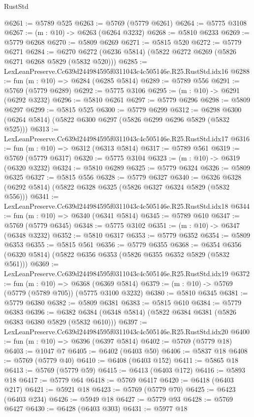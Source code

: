 \begin{lexlean}{RustStd}
\begin{coremodule}
@6261 := @5789 @525
@6263 := @5769 (@5779 @6261)
@6264 := @5775 @3108
@6267 := (m : @10) -> @6263 (@6264 @3232)
@6268 := @5810 @6233
@6269 := @5779 @6268
@6270 := @5809 @6269
@6271 := @5815 @520
@6272 := @5779 @6271
@6284 := @6270 @6272 (@6236 @5814) (@5822 @6272 @6269 (@5826 @6271 @6268 @5829 (@5832 @520)))
@6285 := LexLeanPreserve.Cc639d244984595f0311043c4c505146e.R25.RustStd.idx16
@6288 := fun (m : @10) => @6284 (@6285 @5814)
@6289 := @5789 @556
@6291 := @5769 (@5779 @6289)
@6292 := @5775 @3106
@6295 := (m : @10) -> @6291 (@6292 @3232)
@6296 := @5810 @6261
@6297 := @5779 @6296
@6298 := @5809 @6297
@6299 := @5815 @525
@6300 := @5779 @6299
@6312 := @6298 @6300 (@6264 @5814) (@5822 @6300 @6297 (@5826 @6299 @6296 @5829 (@5832 @525)))
@6313 := LexLeanPreserve.Cc639d244984595f0311043c4c505146e.R25.RustStd.idx17
@6316 := fun (m : @10) => @6312 (@6313 @5814)
@6317 := @5789 @561
@6319 := @5769 (@5779 @6317)
@6320 := @5775 @3104
@6323 := (m : @10) -> @6319 (@6320 @3232)
@6324 := @5810 @6289
@6325 := @5779 @6324
@6326 := @5809 @6325
@6327 := @5815 @556
@6328 := @5779 @6327
@6340 := @6326 @6328 (@6292 @5814) (@5822 @6328 @6325 (@5826 @6327 @6324 @5829 (@5832 @556)))
@6341 := LexLeanPreserve.Cc639d244984595f0311043c4c505146e.R25.RustStd.idx18
@6344 := fun (m : @10) => @6340 (@6341 @5814)
@6345 := @5789 @610
@6347 := @5769 (@5779 @6345)
@6348 := @5775 @3102
@6351 := (m : @10) -> @6347 (@6348 @3232)
@6352 := @5810 @6317
@6353 := @5779 @6352
@6354 := @5809 @6353
@6355 := @5815 @561
@6356 := @5779 @6355
@6368 := @6354 @6356 (@6320 @5814) (@5822 @6356 @6353 (@5826 @6355 @6352 @5829 (@5832 @561)))
@6369 := LexLeanPreserve.Cc639d244984595f0311043c4c505146e.R25.RustStd.idx19
@6372 := fun (m : @10) => @6368 (@6369 @5814)
@6379 := (m : @10) -> @5769 (@5779 (@5789 @705)) (@5775 @3100 @3232)
@6380 := @5810 @6345
@6381 := @5779 @6380
@6382 := @5809 @6381
@6383 := @5815 @610
@6384 := @5779 @6383
@6396 := @6382 @6384 (@6348 @5814) (@5822 @6384 @6381 (@5826 @6383 @6380 @5829 (@5832 @610)))
@6397 := LexLeanPreserve.Cc639d244984595f0311043c4c505146e.R25.RustStd.idx20
@6400 := fun (m : @10) => @6396 (@6397 @5814)
@6402 := @5769 (@5779 @18)
@6403 := @1047 @7
@6405 := @6402 (@6403 @50)
@6406 := @5837 @18
@6408 := @5769 (@5779 @40)
@6410 := @6408 (@6403 @152)
@6411 := @5865 @18
@6413 := @5769 (@5779 @59)
@6415 := @6413 (@6403 @172)
@6416 := @5893 @18
@6417 := @5779 @64
@6418 := @5769 @6417
@6420 := @6418 (@6403 @217)
@6421 := @5921 @18
@6423 := @5769 (@5779 @70)
@6425 := @6423 (@6403 @234)
@6426 := @5949 @18
@6427 := @5779 @93
@6428 := @5769 @6427
@6430 := @6428 (@6403 @303)
@6431 := @5977 @18

\end{coremodule}
\end{lexlean}
